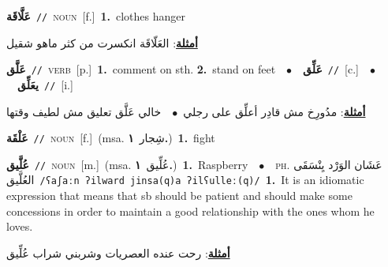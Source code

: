 \documentclass[10pt,a4paper,twoside]{article} %
\begin{document}
\begin{multicols}{2}
{\setlength\topsep{0pt}\textbf{\foreignlanguage{arabic}{عَلَّاقَة}}\ {\color{gray}\texttt{//}\color{black}}\ \textsc{noun}\ [f.]\ \textbf{1.}~clothes hanger\  \begin{flushright}\color{gray}\foreignlanguage{arabic}{\textbf{\underline{\foreignlanguage{arabic}{أمثلة}}}: العَلّاقَة انكسرت من كثر ماهو شقيل}\end{flushright}\color{black}} \vspace{2mm}

{\setlength\topsep{0pt}\textbf{\foreignlanguage{arabic}{عَلَّق}}\ {\color{gray}\texttt{//}\color{black}}\ \textsc{verb}\ [p.]\ \textbf{1.}~comment on sth.  \textbf{2.}~stand on feet\ \ $\bullet$\ \ \setlength\topsep{0pt}\textbf{\foreignlanguage{arabic}{عَلِّق}}\ {\color{gray}\texttt{//}\color{black}}\ [c.]\ \ $\bullet$\ \ \setlength\topsep{0pt}\textbf{\foreignlanguage{arabic}{يعَلِّق}}\ {\color{gray}\texttt{//}\color{black}}\ [i.]\  \begin{flushright}\color{gray}\foreignlanguage{arabic}{\textbf{\underline{\foreignlanguage{arabic}{أمثلة}}}: مدُورِخ مش قادِر أعلِّق على رجلي\ $\bullet$\ \  خالي عَلَّق تعليق مش لطيف وقتها}\end{flushright}\color{black}} \vspace{2mm}

{\setlength\topsep{0pt}\textbf{\foreignlanguage{arabic}{عَلْقَة}}\ {\color{gray}\texttt{//}\color{black}}\ \textsc{noun}\ [f.]\ \color{gray}(msa. \foreignlanguage{arabic}{شِجار}~\foreignlanguage{arabic}{\textbf{١.}})\color{black}\ \textbf{1.}~fight\ } \vspace{2mm}

{\setlength\topsep{0pt}\textbf{\foreignlanguage{arabic}{عُلَّيق}}\ {\color{gray}\texttt{//}\color{black}}\ \textsc{noun}\ [m.]\ \color{gray}(msa. \foreignlanguage{arabic}{عُلِّيق}~\foreignlanguage{arabic}{\textbf{١.}})\color{black}\ \textbf{1.}~Raspberry\ \ $\bullet$\ \ \textsc{ph.} \color{gray} \foreignlanguage{arabic}{عَشَان الوَرْد يِنْسَقَى العُلَّيق}\color{black}\ {\color{gray}\texttt{/{\sffamily ʕaʃaːn ʔilward jinsa(q)a ʔilʕulleː(q)}/}\color{black}}\ \textbf{1.}~It is an idiomatic expression that means that sb should be patient and should make some concessions in order to maintain a good relationship with the ones whom he loves.\  \begin{flushright}\color{gray}\foreignlanguage{arabic}{\textbf{\underline{\foreignlanguage{arabic}{أمثلة}}}: رحت عنده العصريات وشربني شراب عُلِّيق}\end{flushright}\color{black}} \vspace{2mm}


\end{multicols}
\end{document}
